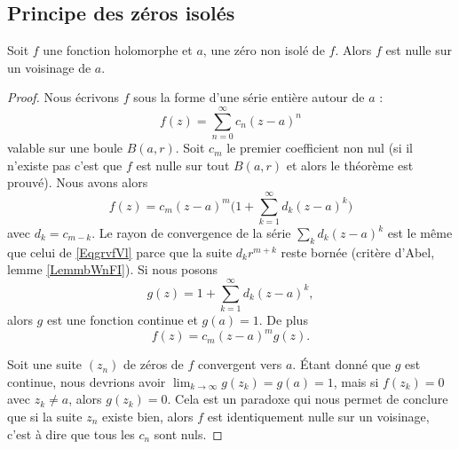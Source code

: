 \subsection{Principe des zéros isolés}

\begin{theorem}     \label{ThoukDPBX}
    Soit \( f\) une fonction holomorphe et \( a\), une zéro non isolé de \( f\). Alors \( f\) est nulle sur un voisinage de \( a\).
\end{theorem}

\begin{proof}
    Nous écrivons \( f\) sous la forme d'une série entière autour de \( a\) :
    \begin{equation}        \label{EqgrvfVl}
        f(z)=\sum_{n=0}^{\infty}c_n(z-a)^n
    \end{equation}
    valable sur une boule \( B(a,r)\). Soit \( c_m\) le premier coefficient non nul (si il n'existe pas c'est que \( f\) est nulle sur tout \( B(a,r) \) et alors le théorème est prouvé). Nous avons alors
    \begin{equation}
        f(z)=c_m(z-a)^m\big( 1+\sum_{k=1}^{\infty}d_k(z-a)^k \big)
    \end{equation}
    avec \( d_k=c_{m-k}\). Le rayon de convergence de la série \( \sum_k d_k(z-a)^k\) est le même que celui de \eqref{EqgrvfVl} parce que la suite \( d_kr^{m+k}\) reste bornée (critère d'Abel, lemme \ref{LemmbWnFI}). Si nous posons
    \begin{equation}
        g(z)=1+\sum_{k=1}^{\infty}d_k(z-a)^k,
    \end{equation}
    alors \( g\) est une fonction continue et \( g(a)=1\). De plus 
    \begin{equation}
        f(z)=c_m(z-a)^mg(z).
    \end{equation}

    Soit une suite \( (z_n)\) de zéros de \( f\) convergent vers \( a\). Étant donné que \( g\) est continue, nous devrions avoir \( \lim_{k\to\infty}g(z_k)=g(a)=1\), mais si \( f(z_k)=0\) avec \( z_k\neq a\), alors \( g(z_k)=0\). Cela est un paradoxe qui nous permet de conclure que si la suite \( z_n\) existe bien, alors \( f\) est identiquement nulle sur un voisinage, c'est à dire que tous les \( c_n\) sont nuls.
\end{proof}

